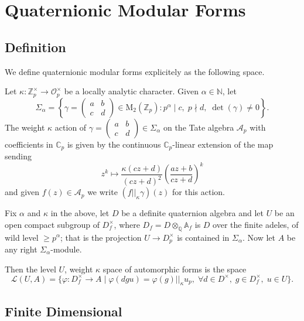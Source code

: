 \chapter{Quaternionic Modular Forms}

\section{Definition}

We define quaternionic modular forms explicitely as the following space.

\begin{definition}
  Let $\kappa : \mathbb{Z}_p^\times \to \mathcal{O}_p^\times$ be a locally analytic character.
  Given $\alpha \in \mathbb{N}$, let
  \[
    \Sigma_\alpha = \left\{ \gamma =  \begin{pmatrix}
      a & b \\
      c & d
    \end{pmatrix}
    \in \text{M}_2(\mathbb{Z}_p) : p^\alpha \mid c, \; p \nmid d, \; \det (\gamma) \neq 0 \right\}.
  \]
  The weight $\kappa$ action of $\gamma =  \begin{pmatrix} a & b \\ c & d \end{pmatrix} \in
  \Sigma_\alpha$ on the Tate algebra $\mathcal{A}_p$ with coefficients in $\mathbb{C}_p$ is given by
  the continuous $\mathbb{C}_p$-linear extension of the map sending
  \[
    z^k \mapsto \frac{\kappa(c z + d)}{(cz + d)^2} \left( \frac{az+b}{cz+d} \right)^k
  \]
  and given $f(z) \in \mathcal{A}_p$ we write $(f||_\kappa \gamma)(z)$ for this action.

  Fix $\alpha$ and $\kappa$ in the above, let $D$ be a definite quaternion algebra and let $U$ be
  an open compact subgroup of $D_f^\times$, where $D_f = D  \otimes_{\mathbb{Q}} \mathbb{A}_f$ is
  $D$ over the finite adeles, of wild level $\geq p^\alpha$; that is the projection
  $U \to D_{p}^\times$ is contained in $\Sigma_\alpha.$
  Now let $A$ be any right $\Sigma_\alpha$-module.

  Then the level $U$, weight $\kappa$ space of automorphic forms is the space
  \[
    \mathcal{L}(U,A) = \{ \varphi : D_f^\times \to A  \;  | \; \varphi (dgu) = \varphi (g)
    ||_\kappa u_p, \; \forall d \in D^\times, \; g \in D^\times_f, \; u \in U \}.
  \]
\end{definition}

\section{Finite Dimensional}

